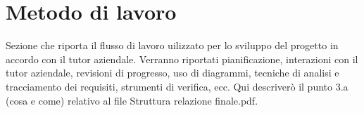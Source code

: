 \section{Metodo di lavoro}

Sezione che riporta il flusso di lavoro uilizzato per lo sviluppo del progetto in accordo con il tutor aziendale.
Verranno riportati pianificazione, interazioni con il tutor aziendale, revisioni di progresso, uso di diagrammi,
tecniche di analisi e tracciamento dei requisiti, strumenti di verifica, ecc.
Qui descriverò il punto 3.a (cosa e come) relativo al file Struttura relazione finale.pdf.
